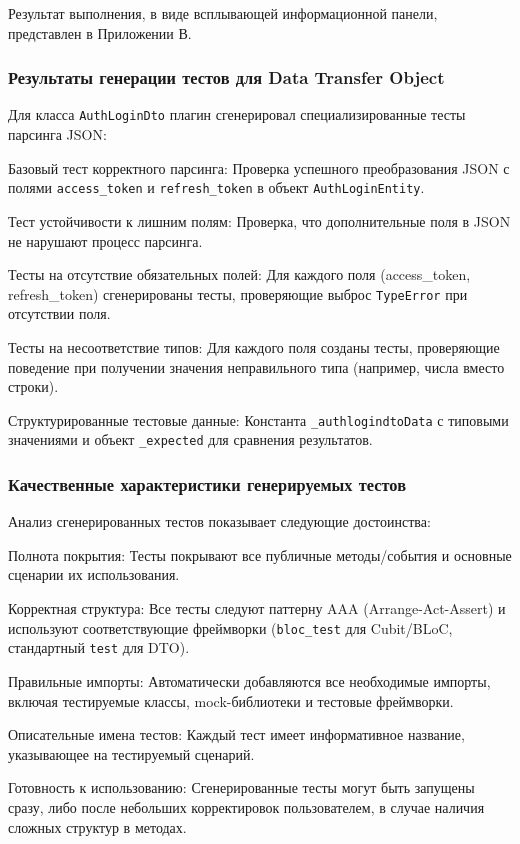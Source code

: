 \documentclass[14pt, russian]{scrartcl}
\begin{document}
Результат выполнения, в виде всплывающей информационной панели, представлен в Приложении В.

\subsubsection{Результаты генерации тестов для Data Transfer Object}

Для класса \texttt{AuthLoginDto} плагин сгенерировал специализированные тесты парсинга JSON:

\begin{itemize*}
    \item Базовый тест корректного парсинга: Проверка успешного преобразования JSON с полями \texttt{access\_token} и \texttt{refresh\_token} в объект \texttt{AuthLoginEntity}.
    \item Тест устойчивости к лишним полям: Проверка, что дополнительные поля в JSON не нарушают процесс парсинга.
    \item Тесты на отсутствие обязательных полей: Для каждого поля (access\_token, refresh\_token) сгенерированы тесты, проверяющие выброс \texttt{TypeError} при отсутствии поля.
    \item Тесты на несоответствие типов: Для каждого поля созданы тесты, проверяющие поведение при получении значения неправильного типа (например, числа вместо строки).
    \item Структурированные тестовые данные: Константа \texttt{\_authlogindtoData} с типовыми значениями и объект \texttt{\_expected} для сравнения результатов.
\end{itemize*}

\subsubsection{Качественные характеристики генерируемых тестов}

Анализ сгенерированных тестов показывает следующие достоинства:

\begin{itemize*}
    \item Полнота покрытия: Тесты покрывают все публичные методы/события и основные сценарии их использования.
    \item Корректная структура: Все тесты следуют паттерну AAA (Arrange-Act-Assert) и используют соответствующие фреймворки (\texttt{bloc\_test} для Cubit/BLoC, стандартный \texttt{test} для DTO).
    \item Правильные импорты: Автоматически добавляются все необходимые импорты, включая тестируемые классы, mock-библиотеки и тестовые фреймворки.
    \item Описательные имена тестов: Каждый тест имеет информативное название, указывающее на тестируемый сценарий.
    \item Готовность к использованию: Сгенерированные тесты могут быть запущены сразу, либо после небольших корректировок пользователем, в случае наличия сложных структур в методах.
\end{itemize*}
\end{document}
